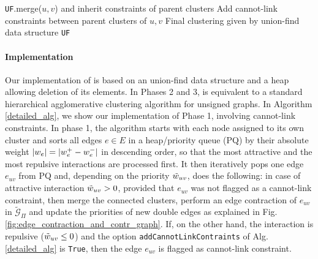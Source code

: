 {\begin{algorithm*}[p]
\begin{algorithmic}[1]
           
              
              \State \texttt{UF}.merge($u,v$) and inherit constraints of parent clusters
              \State Add cannot-link constraints between parent clusters of $u,v$
            \EndIf
          \EndIf
        \EndFor
        \State
        \Return Final clustering given by union-find data structure \texttt{UF}
    \end{algorithmic}
    \label{alg:mutex_watershed}
  \end{algorithm*}
  \clearpage
}

\paragraph{Implementation} Our implementation of \algname{} is based on an union-find data structure and a heap allowing deletion of its elements. 
In Phases 2 and 3, \algname{} is equivalent to a standard hierarchical agglomerative clustering algorithm for unsigned graphs. In Algorithm \ref{detailed_alg}, we show our implementation of Phase 1, involving cannot-link constraints.
In phase 1, the algorithm starts with each node assigned to its own cluster and sorts all edges $e\in E$ in a heap/priority queue (PQ) by their absolute weight $|w_e|=|w_e^+ - w_e^-|$ in descending order, so that the most attractive and the most repulsive interactions are processed first. It then iteratively pops one edge $e_{uv}$ from PQ and, depending on the priority $\tilde{w}_{uv}$, does the following: in case of attractive interaction $\tilde{w}_{uv}>0$, provided that $e_{uv}$ was not flagged as a cannot-link constraint, then merge the connected clusters, perform an edge contraction of $e_{uv}$ in $\tilde{\mathcal{G}}_\Pi$ and update the priorities of new double edges as explained in Fig. \ref{fig:edge_contraction_and_contr_graph}. 
If, on the other hand, the interaction is repulsive ($\tilde{w}_{uv}\leq 0$) and the option \texttt{addCannotLinkContraints} of Alg. \ref{detailed_alg} is \texttt{True}, then the edge $e_{uv}$ is flagged as cannot-link constraint.


